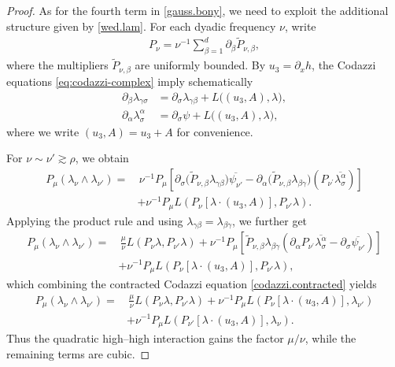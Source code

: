 \documentclass[11pt,letterpaper,reqno]{amsart}
\numberwithin{equation}{section}
\theoremstyle{definition}
\theoremstyle{remark}
\begin{document}
\begin{proof}
As for the fourth term in \eqref{gauss.bony}, we  need to exploit the additional structure  given by \eqref{wed.lam}. For each dyadic frequency \(\nu\), write
\begin{align}
P_\nu
=
\nu^{-1}
\sum_{\beta=1}^d
\partial_\beta\widetilde P_{\nu,\beta},
\label{Pnu.derivative}
\end{align}
where the multipliers \(\widetilde P_{\nu,\beta}\) are uniformly bounded.
By \(u_3=\partial_xh\), the Codazzi equations \eqref{eq:codazzi-complex} imply schematically
\begin{align}
\partial_\beta\lambda_{\gamma\sigma}
&=
\partial_\sigma\lambda_{\gamma\beta}
+
L\bigl((u_3,A),\lambda\bigr),
\label{codazzi.one}
\\
\partial_\alpha\lambda^\alpha_\sigma
&=
\partial_\sigma\psi
+
L\bigl((u_3,A),\lambda\bigr),
\label{codazzi.contracted}
\end{align}
where we write \( (u_3,A)=u_3+A\) for convenience.

For \(\nu\sim\nu'\gtrsim\rho\), we obtain
\begin{align*}
P_\mu(\lambda_\nu\wedge\lambda_{\nu'})
=&\,
\nu^{-1}P_\mu
\left[
\partial_\sigma
\bigl(\widetilde P_{\nu,\beta}\lambda_{\gamma\beta}\bigr)
\overline{\psi_{\nu'}}
-
\partial_\alpha
\bigl(\widetilde P_{\nu,\beta}\lambda_{\beta\gamma}\bigr)
(P_{\nu^\prime}\overline{\lambda^\alpha _{\sigma}})
\right]
\\
&+
\nu^{-1}P_\mu
L\left(
P_\nu[\lambda\cdot(u_3,A)],
P_{\nu'}\lambda
\right).
\end{align*}
Applying the product rule and using
\(\lambda_{\gamma\beta}=\lambda_{\beta\gamma}\), we further get
\begin{align*}
P_\mu(\lambda_\nu\wedge\lambda_{\nu'})
=&\,
\frac{\mu}{\nu}
L(P_\nu\lambda,P_{\nu'}\lambda)
+
\nu^{-1}P_\mu
\left[
\widetilde P_{\nu,\beta}\lambda_{\beta\gamma}
\left(
\partial_\alpha P_{\nu^\prime}\overline{\lambda^\alpha _{\sigma}}
-
\partial_\sigma\overline{\psi_{\nu'}}
\right)
\right]
\\
&+
\nu^{-1}P_\mu
L\left(
P_\nu[\lambda\cdot(u_3,A)],
P_{\nu'}\lambda
\right),
\end{align*}
which combining the contracted Codazzi equation \eqref{codazzi.contracted}
yields
\begin{align}
P_\mu(\lambda_\nu\wedge\lambda_{\nu'})
=&\,
\frac{\mu}{\nu}
L(P_\nu\lambda,P_{\nu'}\lambda)+
\nu^{-1}P_\mu
L\left(
P_\nu[\lambda\cdot(u_3,A)],
\lambda_{\nu'}
\right)
\label{gauss.high.high.identity}
\\
&
 +
\nu^{-1}P_\mu
L\left(
P_{\nu'}[\lambda\cdot(u_3,A)],
\lambda_\nu
\right).
\nonumber
\end{align}
Thus the quadratic high--high interaction gains the factor
\(\mu/\nu\), while the remaining terms are cubic.


\end{proof}
\end{document}
